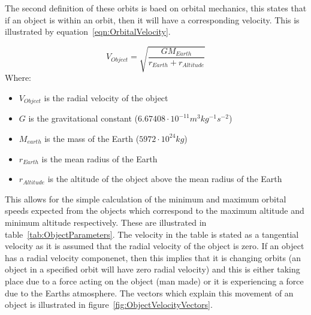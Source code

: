 \documentclass[11pt]{witseiepaper}
\begin{document}
The second definition of these orbits is baed on orbital mechanics, this states that if an object is within an orbit, then it will have a corresponding velocity.
This is illustrated by equation~\ref{eqn:OrbitalVelocity}. 

\begin{equation} \label{eqn:OrbitalVelocity}
    V_{Object} = \sqrt{\frac{G M_{Earth}}{r_{Earth} + r_{Altitude}}}
\end{equation}
Where:
\begin{itemize}
    \item $V_{Object}$ is the radial velocity of the object
    \item $G$ is the gravitational constant ($6.67408 \cdot 10^{-11} m^3 kg^{-1} s^{-2}$)
    \item $M_{earth}$ is the mass of the Earth ($5972 \cdot 10^{24} kg$)
    \item $r_{Earth}$ is the mean radius of the Earth
    \item $r_{Altitude}$ is the altitude of the object above the mean radius of the Earth
\end{itemize}

This allows for the simple calculation of the minimum and maximum orbital speeds expected from the objects which correspond to the maximum altitude and minimum altitude respectively. These are illustrated in table~\ref{tab:ObjectParameters}. The velocity in the table is stated as a tangential velocity as it is assumed that the radial velocity of the object is zero. If an object has a radial velocity componenet, then this implies that it is changing orbits (an object in a specified orbit will have zero radial velocity) and this is either taking place due to a force acting on the object (man made) or it is experiencing a force due to the Earths atmosphere. The vectors which explain this movement of an object is illustrated in figure~\ref{fig:ObjectVelocityVectors}.
\end{document}
